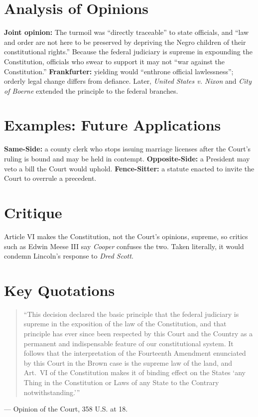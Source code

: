 \documentclass[12pt]{article}
\begin{document}
\section{Analysis of Opinions}
\textbf{Joint opinion:} The turmoil was ``directly traceable'' to state officials, and ``law and order are not here to be preserved by depriving the Negro children of their constitutional rights.'' Because the federal judiciary is supreme in expounding the Constitution, officials who swear to support it may not ``war against the Constitution.'' \textbf{Frankfurter:} yielding would ``enthrone official lawlessness''; orderly legal change differs from defiance. Later, \textit{United States v. Nixon} and \textit{City of Boerne} extended the principle to the federal branches.

\section{Examples: Future Applications}
\textbf{Same-Side:} a county clerk who stops issuing marriage licenses after the Court's ruling is bound and may be held in contempt. \textbf{Opposite-Side:} a President may veto a bill the Court would uphold. \textbf{Fence-Sitter:} a statute enacted to invite the Court to overrule a precedent.

\section{Critique}
Article VI makes the Constitution, not the Court's opinions, supreme, so critics such as Edwin Meese III say \textit{Cooper} confuses the two. Taken literally, it would condemn Lincoln's response to \textit{Dred Scott}.

\section{Key Quotations}
\begin{quote}
``This decision declared the basic principle that the federal judiciary is supreme in the exposition of the law of the Constitution, and that principle has ever since been respected by this Court and the Country as a permanent and indispensable feature of our constitutional system. It follows that the interpretation of the Fourteenth Amendment enunciated by this Court in the Brown case is the supreme law of the land, and Art.\ VI of the Constitution makes it of binding effect on the States `any Thing in the Constitution or Laws of any State to the Contrary notwithstanding.'\thinspace''
\end{quote}
\noindent --- Opinion of the Court, 358 U.S. at 18.
\end{document}
